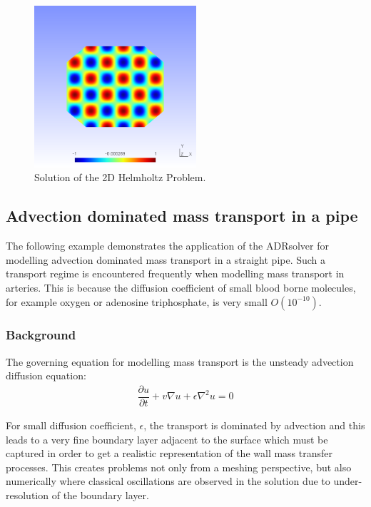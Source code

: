\begin{figure}
\begin{center}
\includegraphics[width=6cm]{img/Helmholtz2D}
\caption{Solution of the 2D Helmholtz Problem.}
\label{f:adrsolver:helmholtz2D}
\end{center}
\end{figure}


\subsection{Advection dominated mass transport in a pipe}

The following example demonstrates the application of the ADRsolver for
modelling advection dominated mass transport in a straight pipe.
Such a transport regime is encountered frequently when modelling mass transport
in arteries. This is because the diffusion coefficient of small blood borne
molecules, for example oxygen or adenosine triphosphate, is very small
$O(10^{-10})$.

\subsubsection{Background}
The governing equation for modelling mass transport is the unsteady advection
diffusion equation:
\begin{align*}
\dfrac{\partial u}{\partial t}  + v\nabla u +  \epsilon \nabla^2 u = 0
\end{align*}

For small diffusion coefficient, $\epsilon$, the transport is dominated by
advection and this leads to a very fine boundary layer adjacent to the surface
which must be captured in order to get a realistic representation of the wall
mass transfer processes. This creates problems not only from a meshing
perspective, but also numerically where classical oscillations are observed in
the solution due to under-resolution of the boundary layer.

